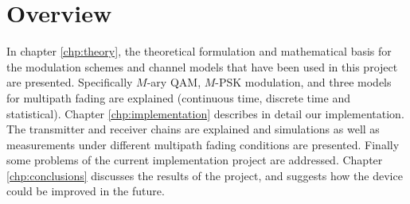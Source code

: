 \section{Overview}

In chapter \ref{chp:theory}, the theoretical formulation and mathematical basis for the modulation schemes and channel models that have been used in this project are presented. Specifically \(M\)-ary QAM, \(M\)-PSK modulation, and three models for multipath fading are explained (continuous time, discrete time and statistical). Chapter \ref{chp:implementation} describes in detail our implementation. The transmitter and receiver chains are explained and simulations as well as measurements under different multipath fading conditions are presented. Finally some problems of the current implementation project are addressed. Chapter \ref{chp:conclusions} discusses the results of the project, and suggests how the device could be improved in the future.
